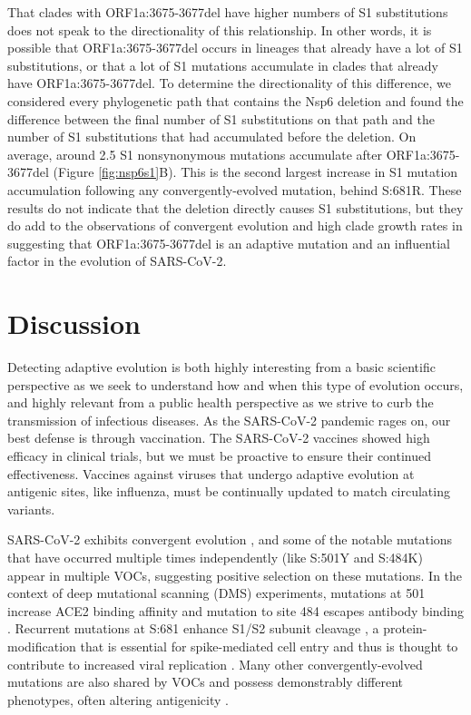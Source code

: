 \documentclass[11pt,oneside,letterpaper]{article}
\begin{document}
That clades with ORF1a:3675-3677del have higher numbers of S1 substitutions does not speak to the directionality of this relationship.
In other words, it is possible that ORF1a:3675-3677del occurs in lineages that already have a lot of S1 substitutions, or that a lot of S1 mutations accumulate in clades that already have ORF1a:3675-3677del.
To determine the directionality of this difference, we considered every phylogenetic path that contains the Nsp6 deletion and found the difference between the final number of S1 substitutions on that path and the number of S1 substitutions that had accumulated before the deletion.
On average, around 2.5 S1 nonsynonymous mutations accumulate after ORF1a:3675-3677del (Figure \ref{fig:nsp6s1}B).
This is the second largest increase in S1 mutation accumulation following any convergently-evolved mutation, behind S:681R.
These results do not indicate that the deletion directly causes S1 substitutions, but they do add to the observations of convergent evolution and high clade growth rates in suggesting that ORF1a:3675-3677del is an adaptive mutation and an influential factor in the evolution of SARS-CoV-2.



\section*{Discussion}
Detecting adaptive evolution is both highly interesting from a basic scientific perspective as we seek to understand how and when this type of evolution occurs, and highly relevant from a public health perspective as we strive to curb the transmission of infectious diseases.
As the SARS-CoV-2 pandemic rages on, our best defense is through vaccination.
The SARS-CoV-2 vaccines showed high efficacy in clinical trials, but we must be proactive to ensure their continued effectiveness.
Vaccines against viruses that undergo adaptive evolution at antigenic sites, like influenza, must be continually updated to match circulating variants.

SARS-CoV-2 exhibits convergent evolution \cite{Van_Dorp2020-ox, Martin2021-lj, Rochman2021-sv}, and some of the notable mutations that have occurred multiple times independently (like S:501Y and S:484K) appear in multiple VOCs, suggesting positive selection on these mutations.
In the context of deep mutational scanning (DMS) experiments, mutations at 501 increase ACE2 binding affinity \cite{Starr2020-bt} and mutation to site 484 escapes antibody binding \cite{Greaney2021-jn}.
Recurrent mutations at S:681 enhance S1/S2 subunit cleavage \cite{Lubinski2021-ul, Liu2021-ne}, a protein-modification that is essential for spike-mediated cell entry \cite{Hoffmann2020-vi} and thus is thought to contribute to increased viral replication \cite{Liu2021-ne}.
Many other convergently-evolved mutations are also shared by VOCs and possess demonstrably different phenotypes, often altering antigenicity \cite{Li2020-jd, McCarthy2021-lg, Wang2021-dm}.
\end{document}

